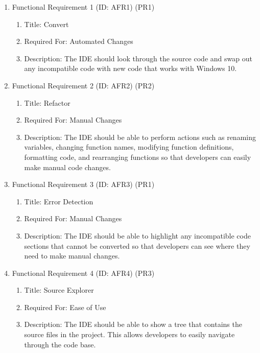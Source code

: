 \documentclass[12pt]{article}
\begin{document}
\begin{enumerate}
    \item Functional Requirement 1 (ID: AFR1) (PR1)
    \begin{enumerate}
        \item Title: Convert
        \item Required For: Automated Changes
        \item Description: The IDE should look through the source code and swap out any incompatible code
        with new code that works with Windows 10.
    \end{enumerate}
    \item Functional Requirement 2 (ID: AFR2) (PR2)
    \begin{enumerate}
        \item Title: Refactor
        \item Required For: Manual Changes
        \item Description: The IDE should be able to perform actions such as renaming variables, changing function names, modifying
        function definitions, formatting code, and rearranging functions so that developers can easily make manual code changes.
    \end{enumerate}
    \item Functional Requirement 3 (ID: AFR3) (PR1)
        \begin{enumerate}
        \item Title: Error Detection
        \item Required For: Manual Changes
        \item Description: The IDE should be able to highlight any incompatible code sections that cannot be converted so that
        developers can see where they need to make manual changes.
    \end{enumerate}
    \item Functional Requirement 4 (ID: AFR4) (PR3)
        \begin{enumerate}
        \item Title: Source Explorer
        \item Required For: Ease of Use
        \item Description: The IDE should be able to show a tree that contains the source files in the project. This allows developers to
        easily navigate through the code base.
    \end{enumerate}
\end{enumerate}
\end{document}
